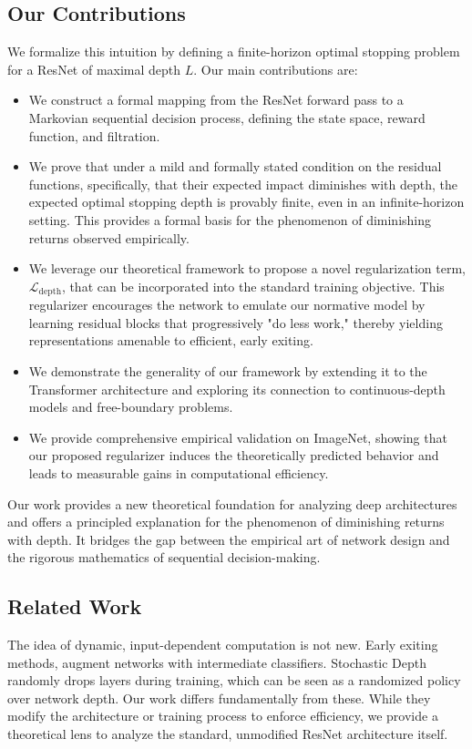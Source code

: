 \documentclass[12pt]{imsart}
\newcommand{\Ldepth}{\mathcal{L}_{\text{depth}}}
\theoremstyle{plain}
\theoremstyle{definition}
\begin{document}
\subsection{Our Contributions}
We formalize this intuition by defining a finite-horizon optimal stopping problem for a ResNet of maximal depth $L$. Our main contributions are:
\begin{itemize}
    \item We construct a formal mapping from the ResNet forward pass to a Markovian sequential decision process, defining the state space, reward function, and filtration.
    \item We prove that under a mild and formally stated condition on the residual functions, specifically, that their expected impact diminishes with depth, the expected optimal stopping depth is provably finite, even in an infinite-horizon setting. This provides a formal basis for the phenomenon of diminishing returns observed empirically.
    \item We leverage our theoretical framework to propose a novel regularization term, $\Ldepth$, that can be incorporated into the standard training objective. This regularizer encourages the network to emulate our normative model by learning residual blocks that progressively "do less work," thereby yielding representations amenable to efficient, early exiting.
    \item We demonstrate the generality of our framework by extending it to the Transformer architecture and exploring its connection to continuous-depth models and free-boundary problems.
    \item We provide comprehensive empirical validation on ImageNet, showing that our proposed regularizer induces the theoretically predicted behavior and leads to measurable gains in computational efficiency.
\end{itemize}
Our work provides a new theoretical foundation for analyzing deep architectures and offers a principled explanation for the phenomenon of diminishing returns with depth. It bridges the gap between the empirical art of network design and the rigorous mathematics of sequential decision-making.

\subsection{Related Work}
The idea of dynamic, input-dependent computation is not new. Early exiting methods, \cite{Teerapittayanon2016} augment networks with intermediate classifiers. Stochastic Depth \cite{Huang2016} randomly drops layers during training, which can be seen as a randomized policy over network depth. Our work differs fundamentally from these. While they modify the architecture or training process to enforce efficiency, we provide a theoretical lens to analyze the standard, unmodified ResNet architecture itself.
\end{document}
